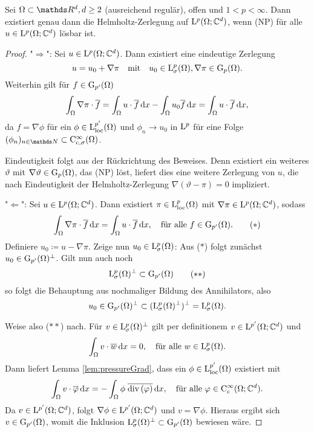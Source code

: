 \begin{thm}
  \label{thm:helmholtzIffNeumann}
  Sei $\Omega \subset \R^d, d \geq 2$ (ausreichend regulär), offen und $1 < p < \infty$.
  Dann existiert genau dann die Helmholtz-Zerlegung auf $\mathrm{L}^p(\Omega; \mathbb{C}^d)$, wenn (NP) für alle $u \in \mathrm{L}^p(\Omega; \mathbb{C}^d)$ lösbar ist.
\end{thm}

\begin{proof}
  "$\Rightarrow$": Sei $u \in\mathrm{L}^p(\Omega; \mathbb{C}^d)$.
  Dann existiert eine eindeutige Zerlegung 
  $$
  u = u_0 + \nabla \pi \quad\text{mit}\quad u_0 \in \mathrm{L}_\sigma^p(\Omega), \nabla\pi \in \mathrm{G}_p(\Omega).
  $$
  Weiterhin gilt für $f \in \mathrm{G}_{p'}(\Omega)$
  $$
  \int_\Omega \nabla\pi \cdot \overline f = \int_\Omega u \cdot \overline f \, {\operatorname{d}\!{x}} - \int_\Omega u_0 \overline f \, {\operatorname{d}\!{x}}  = \int_\Omega u \cdot \overline f \, {\operatorname{d}\!{x}},
  $$
  da $f = \nabla \phi$ für ein $\phi \in \mathrm{L}_{\operatorname{loc}}^{p'}(\Omega)$ und $\phi_n \to u_0$ in $\mathrm{L}^p$ für eine Folge $(\phi_n)_{n \in \N} \subset \CC_{\cc,\sigma}^\infty(\Omega)$.

  Eindeutigkeit folgt aus der Rückrichtung des Beweises. Denn existiert ein weiteres $\vartheta$ mit $\nabla\vartheta \in \mathrm{G}_p(\Omega)$, das (NP) löst, liefert dies eine weitere Zerlegung von $u$, die nach Eindeutigkeit der Helmholtz-Zerlegung $\nabla(\vartheta - \pi) = 0$ impliziert.

  "$\Leftarrow$": Sei $u \in \mathrm{L}^p(\Omega; \mathbb{C}^d)$. Dann existiert $\pi \in \mathrm{L}^p_{\operatorname{loc}}(\Omega)$ mit $\nabla \pi \in \mathrm{L}^p(\Omega; \mathbb{C}^d)$, sodass
  \begin{displaymath}
  \int_\Omega \nabla \pi \cdot \overline f \, {\operatorname{d}\!{x}} = \int_\Omega u \cdot \overline f \, {\operatorname{d}\!{x}}, \quad\text{für alle } f \in \mathrm{G}_{p'}(\Omega).
  \tag{$\ast$}
  \end{displaymath}
  Definiere $u_0 \coloneqq u - \nabla\pi$. 
  Zeige nun $u_0 \in \mathrm{L}_\sigma^p(\Omega)$:
  Aus ($\ast$) folgt zunächst $u_0 \in \mathrm{G}_{p'}(\Omega)^\perp$.
  Gilt nun auch noch 
  \begin{displaymath}
    \mathrm{L}^p_\sigma(\Omega)^\perp \subset \mathrm{G}_{p'}(\Omega) \tag{$\ast\ast$}
  \end{displaymath}
  so folgt die Behauptung aus nochmaliger Bildung des Annihilators, also
  $$
  u_0 \in \mathrm{G}_{p'}(\Omega)^\perp \subset ( \mathrm{L}_\sigma^p(\Omega)^\perp)^\perp = \mathrm{L}^p_\sigma(\Omega).
  $$

  Weise also ($\ast\ast$) nach. Für $v \in \mathrm{L}_\sigma^p(\Omega)^\perp$ gilt per definitionem $v \in \mathrm{L}^{p'}(\Omega; \mathbb{C}^d)$ und
  $$
  \int_\Omega v \cdot \overline w \, {\operatorname{d}\!{x}} = 0, \quad\text{für alle } w \in \mathrm{L}_\sigma^p(\Omega).
  $$
  Dann liefert Lemma \ref{lem:pressureGrad}, dass ein $\phi \in \mathrm{L}_{\operatorname{loc}}^{p'}(\Omega)$ existiert mit
  $$
  \int_\Omega v \cdot \overline \varphi \, {\operatorname{d}\!{x}} = -\int_\Omega \phi \; \overline{\mathrm{div\,} (\varphi)} \, {\operatorname{d}\!{x}}, \quad\text{für alle } \varphi \in \mathrm{C}_{\mathrm{c}}^\infty(\Omega; \mathbb{C}^d).
  $$
  Da $v \in \mathrm{L}^{p'}(\Omega; \mathbb{C}^d)$, folgt $\nabla \phi \in \mathrm{L}^{p'}(\Omega; \mathbb{C}^d)$ und $v = \nabla \phi$.
  Hieraus ergibt sich $v \in \mathrm{G}_{p'}(\Omega)$, womit die Inklusion $\mathrm{L}_\sigma^p(\Omega)^\perp \subset \mathrm{G}_{p'}(\Omega)$ bewiesen wäre.


\end{proof}
